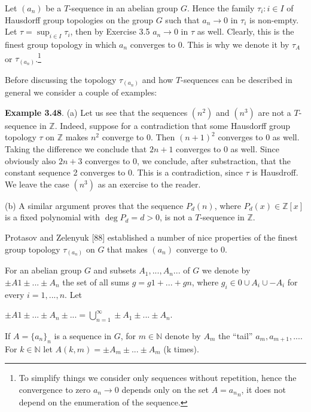 \documentclass[12pt]{article}
\begin{document}
    Let $(a_n)$ be a $T$-sequence in an abelian group $G$. Hence the family ${\tau_i : i \in I}$ of Hausdorff group topologies
    on the group $G$ such that $a_n \to 0$ in $\tau_i$ is non-empty. Let $\tau = \sup_{i \in I} \tau_i$, then by Exercise 3.5 $a_n \to 0$ in $\tau$ as
    well. Clearly, this is the finest group topology in which $a_n$ converges to 0. This is why we denote it by $\tau_A$ or
    $\tau_{(a_n)}$.\footnote[3]{To simplify things we consider only sequences without repetition, hence the convergence to zero $a_n \to 0$ depends only on the
    set $A = {a_n}_n$, it does not depend on the enumeration of the sequence.}
    
    
        Before discussing the topology $\tau_{(a_n)}$ and how $T$-sequences can be described in general we consider a couple
    of examples:
    

    \textbf{Example 3.48}. (a) Let us see that the sequences $(n^2)$ and $(n^3)$ are not a $T$-sequence in $\mathbb{Z}$. Indeed, suppose
    for a contradiction that some Hausdorff group topology $\tau$ on $\mathbb{Z}$ makes $n^2$ converge to 0. Then $(n + 1)^2$
    converges to 0 as well. Taking the difference we conclude that $2n+1$ converges to 0 as well. Since obviously
    also $2n + 3$ converges to 0, we conclude, after substraction, that the constant sequence 2 converges to 0.
    This is a contradiction, since $\tau$ is Hausdroff. We leave the case $(n^3)$ as an exercise to the reader.
    
    
    (b) A similar argument proves that the sequence $P_d (n)$, where $P_d (x) \in \mathbb{Z}[x]$ is a fixed polynomial with
    $\deg P_d = d > 0$, is not a $T$-sequence in $\mathbb{Z}$.
    
    
    Protasov and Zelenyuk [88] established a number of nice properties of the finest group topology $\tau_{(a_n)}$ on $G$
    that makes $(a_n)$ converge to 0.


    For an abelian group $G$ and subsets $A_1, . . . , A_n . . .$ of $G$ we denote by $\pm A1 \pm . . . \pm A_n$ the set of all sums
    $g = g1 + . . . + gn$, where $g_i \in {0} \cup A_i \cup -A_i$ for every $i = 1, . . . , n$. Let
    
    
        $\pm A1 \pm . . . \pm A_n \pm . . . = \bigcup^{\infty}_{n=1} \pm A_1 \pm . . . \pm A_n$.
    
    
        If $A = \{a_n\}_n$ is a sequence in $G$, for $m \in \mathbb{N}$ denote by $A_m$ the “tail” ${a_{m}, a_{m+1}, . . .}$. For $k \in \mathbb{N}$ let
    $A(k, m) = \pm A_m \pm . . . \pm A_m$ (k times).
    
\end{document}
